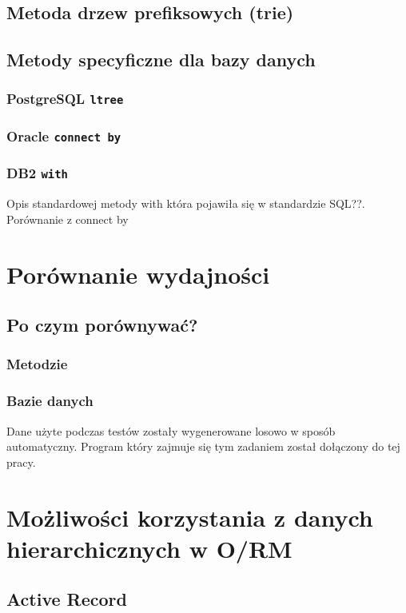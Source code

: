 \documentclass[10pt,a4paper,oneside]{book}
\begin{document}
\section{Metoda drzew prefiksowych (trie)}

\section{Metody specyficzne dla bazy danych}
\subsection{PostgreSQL \texttt{ltree}}
\subsection{Oracle \texttt{connect by}}
\subsection{DB2 \texttt{with}}
Opis standardowej metody with która pojawiła się w standardzie SQL??. Porównanie z connect by

\chapter{Porównanie wydajności}
\section{Po czym porównywać?}
\subsection{Metodzie}
\subsection{Bazie danych}



Dane użyte podczas testów zostały wygenerowane losowo w sposób automatyczny. Program który zajmuje się tym zadaniem został dołączony do tej pracy.

\chapter{Możliwości korzystania z danych hierarchicznych w O/RM}
\section{Active Record}
\end{document}
